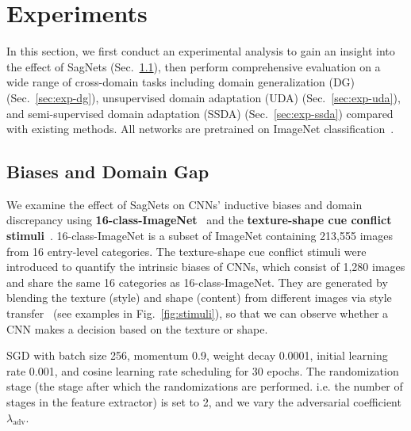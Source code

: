 \section{Experiments}
\label{sec:experiments}
In this section, we first conduct an experimental analysis to gain an insight into the effect of SagNets (Sec.~\ref{sec:exp-bias}), then perform comprehensive evaluation on a wide range of cross-domain tasks including domain generalization (DG) (Sec.~\ref{sec:exp-dg}), unsupervised domain adaptation (UDA) (Sec.~\ref{sec:exp-uda}), and semi-supervised domain adaptation (SSDA) (Sec.~\ref{sec:exp-ssda}) compared with existing methods.
All networks are pretrained on ImageNet classification~\cite{russakovsky2015imagenet}.


\subsection{Biases and Domain Gap}
\label{sec:exp-bias}
We examine the effect of SagNets on CNNs' inductive biases and domain discrepancy using \textbf{16-class-ImageNet}~\cite{geirhos2018generalisation} and the \textbf{texture-shape cue conflict stimuli}~\cite{geirhos2019imagenet}.
16-class-ImageNet is a subset of ImageNet containing 213,555 images from 16 entry-level categories.
The texture-shape cue conflict stimuli were introduced to quantify the intrinsic biases of CNNs, which consist of 1,280 images and share the same 16 categories as 16-class-ImageNet.
They are generated by blending the texture (style) and shape (content) from different images via style transfer~\cite{gatys2016image} (see examples in Fig.~\ref{fig:stimuli}), so that we can observe whether a CNN makes a decision based on the texture or shape. 

 SGD with batch size 256, momentum 0.9, weight decay 0.0001, initial learning rate 0.001, and cosine learning rate scheduling for 30 epochs.
The randomization stage (the stage after which the randomizations are performed. i.e. the number of stages in the feature extractor) is set to 2, and we vary the adversarial coefficient $\lambda_\text{adv}$.


